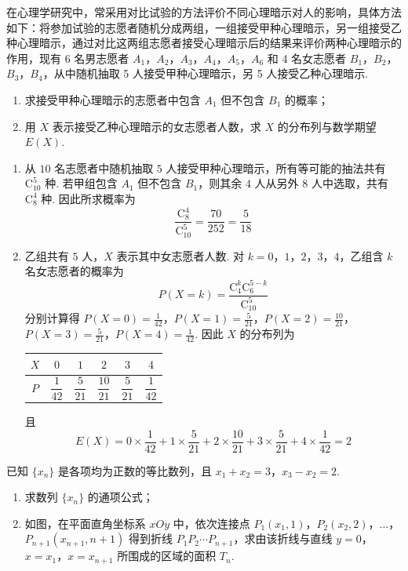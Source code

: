 \begin{problem}
在心理学研究中，常采用对比试验的方法评价不同心理暗示对人的影响，具体方法如下：将参加试验的志愿者随机分成两组，一组接受甲种心理暗示，另一组接受乙种心理暗示，通过对比这两组志愿者接受心理暗示后的结果来评价两种心理暗示的作用，现有 6 名男志愿者 \(A_1\)，\(A_2\)，\(A_3\)，\(A_4\)，\(A_5\)，\(A_6\) 和 4 名女志愿者 \(B_1\)，\(B_2\)，\(B_3\)，\(B_4\)，从中随机抽取 5 人接受甲种心理暗示，另 5 人接受乙种心理暗示.

\begin{enumerate}
\item 求接受甲种心理暗示的志愿者中包含 \(A_1\) 但不包含 \(B_1\) 的概率；
\item 用 \(X\) 表示接受乙种心理暗示的女志愿者人数，求 \(X\) 的分布列与数学期望 \(E(X)\).
\end{enumerate}
\end{problem}

\begin{solution}
\begin{enumerate}
\item 从 \(10\) 名志愿者中随机抽取 \(5\) 人接受甲种心理暗示，所有等可能的抽法共有 \(\mathrm C_{10}^5\) 种. 若甲组包含 \(A_1\) 但不包含 \(B_1\)，则其余 \(4\) 人从另外 \(8\) 人中选取，共有 \(\mathrm C_8^4\) 种. 因此所求概率为
\[
\frac{\mathrm C_8^4}{\mathrm C_{10}^5}=\frac{70}{252}=\frac5{18}
\]
\item 乙组共有 \(5\) 人，\(X\) 表示其中女志愿者人数. 对 \(k=0\)，\(1\)，\(2\)，\(3\)，\(4\)，乙组含 \(k\) 名女志愿者的概率为
\[
P(X=k)=\frac{\mathrm C_4^k\mathrm C_6^{5-k}}{\mathrm C_{10}^5}
\]
分别计算得
\(P(X=0)=\frac1{42}\)，\(P(X=1)=\frac5{21}\)，\(P(X=2)=\frac{10}{21}\)，\(P(X=3)=\frac5{21}\)，\(P(X=4)=\frac1{42}\).
因此 \(X\) 的分布列为
\begin{center}
\begin{tabular}{c|ccccc}
\(X\) & \(0\) & \(1\) & \(2\) & \(3\) & \(4\) \\
\hline
\(P\) & \(\dfrac1{42}\) & \(\dfrac5{21}\) & \(\dfrac{10}{21}\) & \(\dfrac5{21}\) & \(\dfrac1{42}\)
\end{tabular}
\end{center}
且
\[
E(X)=0\times\frac1{42}+1\times\frac5{21}+2\times\frac{10}{21}+3\times\frac5{21}+4\times\frac1{42}=2
\]
\end{enumerate}
\end{solution}

\begin{problem}
已知 \(\{x_n\}\) 是各项均为正数的等比数列，且 \(x_1+x_2=3\)，\(x_3-x_2=2\).

\begin{enumerate}
\item 求数列 \(\{x_n\}\) 的通项公式；
\item 如图，在平面直角坐标系 \(xOy\) 中，依次连接点 \(P_1(x_1,1)\)，\(P_2(x_2,2)\)，\(\ldots\)，\(P_{n+1}(x_{n+1},n+1)\) 得到折线 \(P_1P_2\cdots P_{n+1}\)，求由该折线与直线 \(y=0\)，\(x=x_1\)，\(x=x_{n+1}\) 所围成的区域的面积 \(T_n\).
\end{enumerate}

\end{problem}

